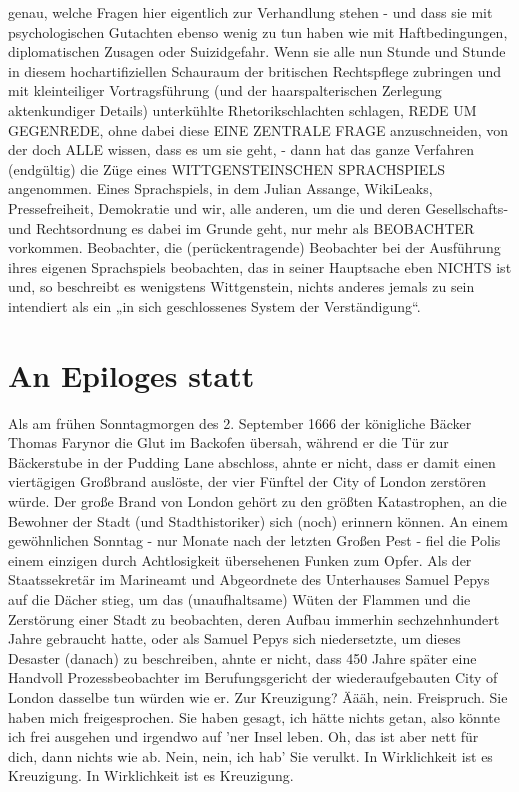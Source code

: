 \begin{multicols}{2}
genau, welche Fragen hier eigentlich zur Verhandlung
stehen - und dass sie mit psychologischen Gutachten
ebenso wenig zu tun haben wie mit Haftbedingungen,
diplomatischen Zusagen oder Suizidgefahr.
Wenn sie alle nun Stunde und Stunde in diesem hochartifiziellen Schauraum der britischen Rechtspflege zubringen und mit kleinteiliger Vortragsführung (und der
haarspalterischen Zerlegung aktenkundiger Details)
unterkühlte Rhetorikschlachten schlagen, REDE UM
GEGENREDE, ohne dabei diese EINE ZENTRALE FRAGE anzuschneiden, von der doch ALLE wissen, dass es
um sie geht, - dann hat das ganze Verfahren (endgültig)
die Züge eines WITTGENSTEINSCHEN SPRACHSPIELS
angenommen.
Eines Sprachspiels, in dem Julian Assange, WikiLeaks,
Pressefreiheit, Demokratie und wir, alle anderen, um die
und deren Gesellschafts- und Rechtsordnung es dabei
im Grunde geht, nur mehr als BEOBACHTER vorkommen. Beobachter, die (perückentragende) Beobachter
bei der Ausführung ihres eigenen Sprachspiels beobachten, das in seiner Hauptsache eben NICHTS ist und, so
beschreibt es wenigstens Wittgenstein, nichts anderes
jemals zu sein intendiert als ein „in sich geschlossenes
System der Verständigung“.



\chapter{An Epiloges statt} %
Als am frühen Sonntagmorgen des 2. September 1666
der königliche Bäcker Thomas Farynor die Glut im Backofen übersah, während er die Tür zur Bäckerstube in der
Pudding Lane abschloss, ahnte er nicht, dass er damit
einen viertägigen Großbrand auslöste, der vier Fünftel
der City of London zerstören würde. Der große Brand
von London gehört zu den größten Katastrophen, an die
Bewohner der Stadt (und Stadthistoriker) sich (noch) erinnern können. An einem gewöhnlichen Sonntag - nur
Monate nach der letzten Großen Pest - fiel die Polis einem einzigen durch Achtlosigkeit übersehenen Funken
zum Opfer.
Als der Staatssekretär im Marineamt und Abgeordnete
des Unterhauses Samuel Pepys auf die Dächer stieg, um
das (unaufhaltsame) Wüten der Flammen und die Zerstörung einer Stadt zu beobachten, deren Aufbau immerhin sechzehnhundert Jahre gebraucht hatte, oder
als Samuel Pepys sich niedersetzte, um dieses Desaster
(danach) zu beschreiben, ahnte er nicht, dass 450 Jahre
später eine Handvoll Prozessbeobachter im Berufungsgericht der wiederaufgebauten City of London dasselbe
tun würden wie er.
Zur Kreuzigung? Äääh, nein. Freispruch. Sie haben mich
freigesprochen. Sie haben gesagt, ich hätte nichts getan,
also könnte ich frei ausgehen und irgendwo auf ’ner Insel leben. Oh, das ist aber nett für dich, dann nichts wie
ab. Nein, nein, ich hab’ Sie verulkt. In Wirklichkeit ist es
Kreuzigung.
In Wirklichkeit ist es Kreuzigung.



\end{multicols}
